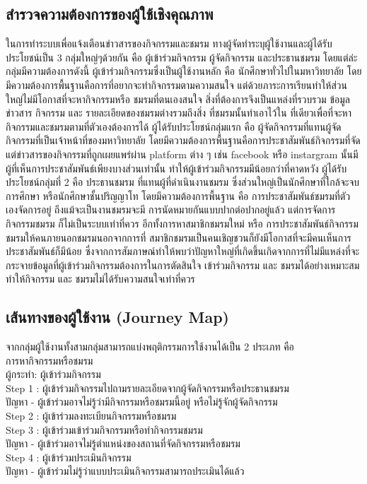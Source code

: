 \documentclass[14pt,oneside,openright,a4paper]{cpe-thai-project}
\begin{document}
\subsection{สำรวจความต้องการของผู้ใช้เชิงคุณภาพ}
  ในการทำระบบเพื่อแจ้งเตือนข่าวสารของกิจกรรมและชมรม ทางผู้จัดทำระบุผู้ใช้งานและผู้ได้รับประโยชน์เป็น 3 กลุ่มใหญ่ๆด้วยกัน คือ ผู้เข้าร่วมกิจกรรม ผู้จัดกิจกรรม และประธานชมรม โดยแต่ล่ะกลุ่มมีความต้องการดังนี้
  ผู้เข้าร่วมกิจกรรมซึ่งเป็นผู้ใช้งานหลัก คือ นักศึกษาทั่วไปในมหาวิทยาลัย โดยมีความต้องการพื้นฐานคือการที่อยากจะทำกิจกรรมตามความสนใจ แต่ด้วยภาระการเรียนทำให้ส่วนใหญ่ไม่มีโอกาสที่จะหากิจกรรมหรือ ชมรมที่ตนเองสนใจ สิ่งที่ต้องการจึงเป็นแหล่งที่รวบรวม ข้อมูลข่าวสาร กิจกรรม และ รายละเอียดของชมรมต่างรวมถึงสิ่ง ที่ชมรมนั้นทำเอาไว้ใน ที่เดียวเพื่อที่จะหากิจกรรมและชมรมตามที่ตัวเองต้องการได้
  ผู้ได้รับประโยชน์กลุ่มแรก คือ ผู้จัดกิจกรรมที่แทนผู้จัดกิจกรรมที่เป็นเจ้าหน้าที่ของมหาวิทยาลัย โดยมีความต้องการพื้นฐานคือการประชาสัมพันธ์กิจกรรมที่จัด แต่ข่าวสารของกิจกรรมที่ถูกเผยแพร่ผ่าน platform ต่าง ๆ เช่น facebook หรือ instargram นั้นมีผู้ที่เห็นการประชาสัมพันธ์เพียงบางส่วนเท่านั้น ทำให้ผู้เข้าร่วมกิจกรรมมีน้อยกว่าที่คาดหวัง
  ผู้ได้รับประโยชน์กลุ่มที่ 2 คือ ประธานชมรม ที่แทนผู้ที่ดำเนินงานชมรม ซึ่งส่วนใหญ่เป็นนักศึกษาที่ใกล้จะจบการศึกษา หรือนักศึกษาชั้นปริญญาโท โดยมีความต้องการพื้นฐาน คือ การประชาสัมพันธ์ชมรมที่ตัวเองจัดการอยู่ ถึงแม้จะเป็นงานชมรมจะมี การนัดหมายกันแบบปากต่อปากอยู่แล้ว แต่การจัดการกิจกรรมชมรม ก็ไม่เป็นระบบเท่าที่ควร อีกทั้งการหาสมาชิกชมรมใหม่ หรือ การประชาสัมพันธ์กิจกรรมชมรมให้คนภายนอกชมรมนอกจากการที่ สมาชิกชมรมเป็นคนเชิญชวนก็ยังมีโอกาสที่จะมีคนเห็นการประชาสัมพันธ์ก็มีน้อย
  ซึ่งจากการสัมภาษณ์ทำให้พบว่าปัญหาใหญ่ที่เกิดขึ้นเกิดจากการที่ไม่มีแหล่งที่จะกระจายข้อมูลที่ผู้เข้าร่วมกิจกรรมต้องการในการตัดสินใจ เข้าร่วมกิจกรรม และ ชมรมได้อย่างเหมาะสม ทำให้กิจกรรม และ ชมรมไม่ได้รับความสนใจเท่าที่ควร

\subsection{เส้นทางของผู้ใช้งาน (Journey Map)}
  จากกลุ่มผู้ใช้งานทั้งสามกลุ่มสามารถแบ่งพฤติกรรมการใช้งานได้เป็น 2 ประเภท คือ \\
  การหากิจกรรมหรือชมรม \\
  ผู้กระทำ: ผู้เข้าร่วมกิจกรรม \\
  Step 1 : ผู้เข้าร่วมกิจกรรมไปถามรายละเอียดจากผู้จัดกิจกรรมหรือประธานชมรม \\
  ปัญหา - ผู้เข้าร่วมอาจไม่รู้ว่ามีกิจกรรมหรือชมรมนี้อยู่ หรือไม่รู้จักผู้จัดกิจกรรม \\
  Step 2 : ผู้เข้าร่วมลงทะเบียนกิจกรรมหรือชมรม \\
  Step 3 : ผู้เข้าร่วมเข้าร่วมกิจกรรมหรือทำกิจกรรมชมรม \\
  ปัญหา - ผู้เข้าร่วมอาจไม่รู้ตำแหน่งของสถานที่จัดกิจกรรมหรือชมรม \\
  Step 4 : ผู้เข้าร่วมประเมินกิจกรรม \\
  ปัญหา - ผู้เข้าร่วมไม่รู้ว่าแบบประเมินกิจกรรมสามารถประเมินได้แล้ว \\
\end{document}
